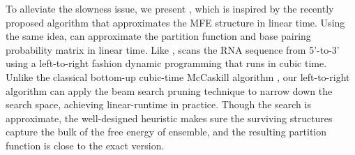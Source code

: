 
To alleviate the slowness issue, 
we present \linearpartition, 
which is inspired by the %
recently proposed \linearfold algorithm \cite{huang+:2019} 
that approximates the MFE structure in linear time.
Using the same idea, \linearpartition can approximate
the partition function and base pairing probability matrix in linear time.
Like \linearfold,
\linearpartition %
scans the RNA sequence from 5'-to-3'
using a left-to-right fashion dynamic programming
that runs in cubic time.
Unlike the classical bottom-up cubic-time McCaskill algorithm \cite{mccaskill:1990},
our left-to-right algorithm can apply the beam search pruning \cite{Huang+Sagae:2010} technique
to narrow down the search space, 
achieving linear-runtime in practice.
Though the search is approximate,
the well-designed heuristic makes sure 
the surviving structures capture the bulk of the free energy of ensemble,
and the resulting partition function is close to the exact version.  


